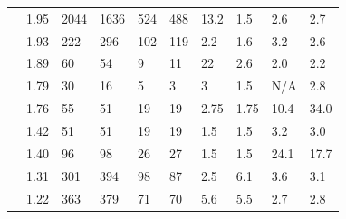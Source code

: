 \documentclass[utf8]{FrontiersinHarvard} %
\begin{document}
\begin{table}[h!]
\begin{ssmall}
\begin{tabular}{llllllllll}
			\cite{rhee_national_2019}        & 1.95      & 2044                                 & 1636                                    & 524                          & 488                                        & 13.2      & 1.5       & 2.6       & 2.7       \\
			\cite{bbosa_short_2020}          & 1.93      & 222                                  & 296                                     & 102                          & 119                                        & 2.2       & 1.6       & 3.2       & 2.6       \\
			\citet{dalai_combining_2018}     & 1.89      & 60                                   & 54                                      & 9                            & 11                                         & 22        & 2.6       & 2.0       & 2.2       \\ %
			\cite{Temereanca:2017aa}         & 1.79      & 30                                   & 16                                      & 5                            & 3                                          & 3         & 1.5       & N/A       & 2.8       \\
			\cite{Yu:2022aa}                 & 1.76      & 55                                   & 51                                      & 19                           & 19                                         & 2.75      & 1.75      & 10.4      & 34.0      \\
			\citet{sivay_hiv-1_2018}         & 1.42      & 51                                   & 51                                      & 19                           & 19                                         & 1.5       & 1.5       & 3.2       & 3.0       \\
			\cite{Zai:2020aa}                & 1.40      & 96                                   & 98                                      & 26                           & 27                                         & 1.5       & 1.5       & 24.1      & 17.7      \\ %
			\cite{Little:2014aa}             & 1.31      & 301                                  & 394                                     & 98                           & 87                                         & 2.5       & 6.1       & 3.6       & 3.1       \\ %
			\cite{brenner_role_2021}         & 1.22      & 363                                  & 379                                     & 71                           & 70                                         & 5.6       & 5.5       & 2.7       & 2.8       \\

\end{tabular}
\end{ssmall}
\end{table}
\end{document}
